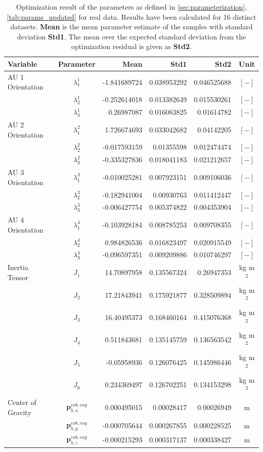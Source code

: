 \begin{table}[H]
\begin{tabular}{lcrrrc}
Variable & Parameter & Mean & Std1 & Std2 & Unit \\
\hline \hline
AU 1 Orientation & $\lambda_1^1$ & -1.841689724 & 0.038953292 & 0.046525688 & $[-]$ \\
                 & $\lambda_2^1$ & -0.252614018 & 0.013382649 & 0.015530261 & $[-]$ \\
                 & $\lambda_3^1$ &  0.26987087 & 0.016083825 & 0.01614782 & $[-]$ \\
AU 2 Orientation & $\lambda_1^2$ &  1.726674693 & 0.033042682 & 0.04142205 & $[-]$ \\
                 & $\lambda_2^2$ & -0.017593159 & 0.01355598 & 0.012474474 & $[-]$ \\
                 & $\lambda_3^2$ & -0.335327836 & 0.018041183 & 0.021212657 & $[-]$ \\
AU 3 Orientation & $\lambda_1^3$ & -0.010025281 & 0.007923151 & 0.009106036 & $[-]$ \\
                 & $\lambda_2^3$ & -0.182941004 & 0.00930763 & 0.011412447 & $[-]$ \\
                 & $\lambda_3^3$ & -0.006427754 & 0.005374822 & 0.004353904 & $[-]$ \\
AU 4 Orientation & $\lambda_1^4$ & -0.103928184 & 0.008785253 & 0.009708355 & $[-]$ \\
                 & $\lambda_2^4$ &  0.984826536 & 0.016823497 & 0.020915549 & $[-]$ \\
                 & $\lambda_3^4$ & -0.096597351 & 0.009209886 & 0.010746297 & $[-]$ \\
\hline
Inertia Tensor & $J_1$ & 14.70897958 & 0.135567324 & 0.26947353 & kg m$^2$ \\
               & $J_2$ & 17.21843941 & 0.175921877 & 0.328509894 & kg m$^2$ \\
               & $J_3$ & 16.40495373 & 0.168460164 & 0.415076368 & kg m$^2$ \\
               & $J_4$ & 0.511843681 & 0.135145759 & 0.136563542 & kg m$^2$ \\
               & $J_5$ & -0.05958936 & 0.126076425 & 0.145986446 & kg m$^2$ \\
               & $J_6$ & 0.234369497 & 0.126702251 & 0.134153298 & kg m$^2$ \\
\hline
Center of Gravity & $\mathbf{p}_{b,x}^{cob,cog}$ & 0.000495015 & 0.00028417 & 0.00026949 & m \\
                  & $\mathbf{p}_{b,y}^{cob,cog}$ & -0.000705644 & 0.000267855 & 0.000228525 & m \\
                  & $\mathbf{p}_{b,z}^{cob,cog}$ & -0.000215293 & 0.000317137 & 0.000338427 & m \\
\hline
\end{tabular}
\caption{Optimization result of the parameters as defined in \cref{sec:parameterization}, \cref{tab:params_updated} for real data. Results have been calculated for 16 distinct datasets. \textbf{Mean} is the mean parameter estimate of the samples with standard deviation \textbf{Std1}. The mean over the expected standard deviation from the optimization residual is given as \textbf{Std2}. }
\end{table}
